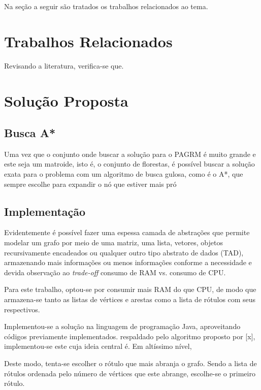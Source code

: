\documentclass[12pt]{article}
\begin{document}
	Na seção a seguir são tratados os trabalhos relacionados ao tema.

\section{Trabalhos Relacionados}\label{sec:trabalhosRelacionados}

	Revisando a literatura, verifica-se que.

\section{Solução Proposta}\label{sec:solucao}

	\subsection{Busca A*}\label{sec:aestrela}

		Uma vez que o conjunto onde buscar a solução para o PAGRM é muito grande e este seja um matroide, isto é, o conjunto de florestas, é possível buscar a solução exata para o problema com um algoritmo de busca gulosa, como é o A*, que sempre escolhe para expandir o nó que estiver mais pró

	\subsection{Implementação}\label{sec:implementacao}

	Evidentemente é possível fazer uma espessa camada de abstrações que permite modelar um grafo por meio de uma matriz, uma lista, vetores, objetos recursivamente encadeados ou qualquer outro tipo abstrato de dados (TAD), armazenando mais informações ou menos informações conforme a necessidade e devida observação ao \textit{trade-off} consumo de RAM vs. consumo de CPU.

	Para este trabalho, optou-se por consumir mais RAM do que CPU, de modo que armazena-se tanto as listas de vértices e arestas como a lista de rótulos com seus respectivos.

	Implementou-se a solução na linguagem de programação Java, aproveitando códigos previamente implementados.
	respaldado pelo algoritmo proposto por [x], implementou-se este cuja ideia central é.
	Em altíssimo nível,

	Deste modo, tenta-se escolher o rótulo que mais abranja o grafo. Sendo a lista de rótulos ordenada pelo número de vértices que este abrange, escolhe-se o primeiro rótulo.
\end{document}
